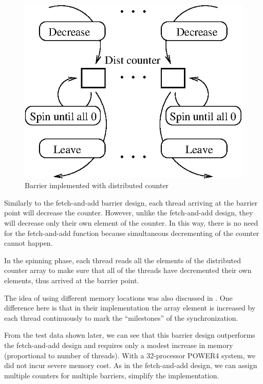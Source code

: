 \begin{figure}[htbp]
  \begin{center}
    \includegraphics[angle=0, scale=.85]{distcounter.eps}
    \caption{Barrier implemented with distributed counter}
    \label{fig:distcounter}
  \end{center}
\end{figure}

Similarly to the fetch-and-add barrier design, each thread arriving at the barrier
point will decrease the counter. However, unlike the fetch-and-add design, they
will decrease only their own element of the counter. In this way, there is
no need for the fetch-and-add function because simultaneous decrementing of the counter cannot happen.

In the spinning phase, each thread reads all the elements of the
distributed counter array to make sure that all of the threads have decremented
their own elements, thus arrived at the barrier point.

The idea of using different memory locations was also discussed in
\cite{Kre01}. One difference here is that in their implementation the
array element is increased by each thread continuously to mark the
``milestones'' of the synchronization.

From the test data shown later, we can see that this
barrier design outperforms the fetch-and-add design and requires only a modest increase in memory (proportional to number of threads).
With a 32-processor POWER4 system, we did not incur severe memory cost.
As in the fetch-and-add design, we can assign multiple counters for multiple
barriers, simplify the implementation.

